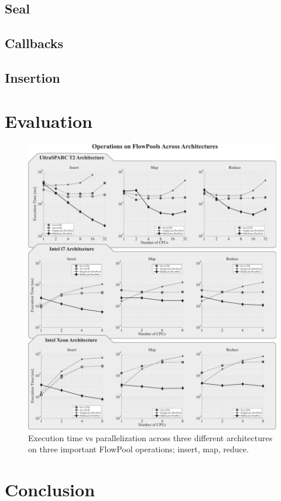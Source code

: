 \documentclass[runningheads,a4paper,fleqn]{llncs}
\begin{document}
\subsection{Seal}

\subsection{Callbacks}



\subsection{Insertion}

\section{Evaluation}

\begin{figure}
\centering
\includegraphics[width=\textwidth]{../../benchmarks/graphs/scaling-operations}
\setlength{\abovecaptionskip}{-10pt}
\setlength{\belowcaptionskip}{-20pt}
\caption{Execution time vs parallelization across three different
architectures on three important FlowPool operations; insert, map, 
reduce.}
\label{fig:eval-cpu-scaling}
\end{figure}

\section{Conclusion}



\end{document}
